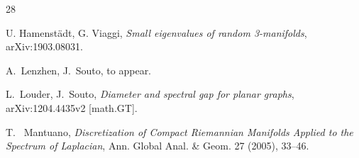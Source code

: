 \documentclass[11pt]{amsart}
\theoremstyle{plain}
\theoremstyle{plain}
\theoremstyle{definition}
\begin{document}
\begin{thebibliography}{28}





 U. Hamenst\"adt, G. Viaggi, {\em Small eigenvalues of random 3-manifolds},
arXiv:1903.08031.





 





 A.~Lenzhen, J.~Souto, to appear.

 L.~Louder, J.~Souto, {\em Diameter and spectral gap for planar graphs}, arXiv:1204.4435v2 [math.GT].






 T.~ Mantuano, {\em Discretization of Compact Riemannian Manifolds Applied to the Spectrum of Laplacian}, Ann.  Global 
Anal. \& Geom. 27 (2005), 33--46.







\end{thebibliography}
\end{document}
